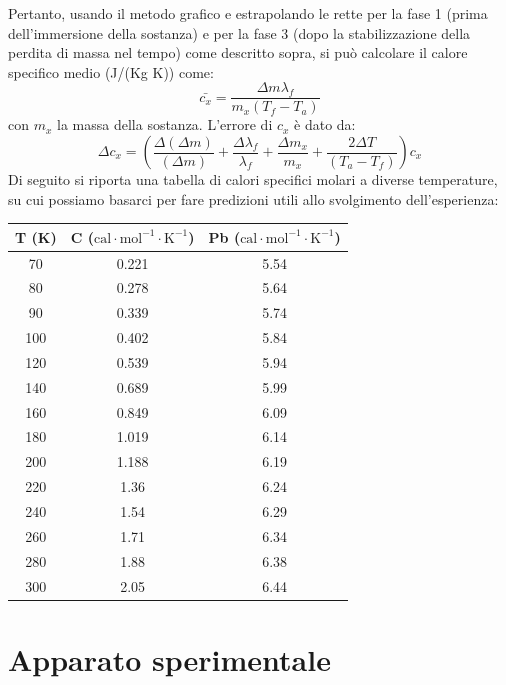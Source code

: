 \documentclass[a4paper,12pt]{article}
\begin{document}
Pertanto, usando il metodo grafico e estrapolando le rette per la fase 1 (prima dell'immersione
della sostanza) e per la fase 3 (dopo la stabilizzazione della perdita di massa nel tempo) come
descritto sopra, si può calcolare il calore specifico medio (J/(Kg K)) come:
\begin{equation*}
        \bar{c_x} = \frac{\Delta m \lambda_f}{m_x (T_f - T_a)}
\end{equation*}
con $m_x$ la massa della sostanza. L'errore di $c_x$ è dato da:
\begin{equation*}
    \Delta c_x = \left( \frac{\Delta (\Delta m)}{(\Delta m)} + \frac{\Delta \lambda_f}{\lambda_f} + \frac{\Delta m_x}{m_x} + \frac{2 \Delta T}{(T_a - T_f)} \right) c_x
\end{equation*}
Di seguito si riporta una tabella di calori specifici molari a diverse temperature, su cui possiamo basarci per 
fare predizioni utili allo svolgimento dell'esperienza:
\begin{table}[H]
\centering
\begin{tabular}{ccc}
\toprule
\textbf{T} (K) & \textbf{C} ($\text{cal}\cdot\text{mol}^{-1}\cdot\text{K}^{-1}$) & \textbf{Pb} ($\text{cal}\cdot\text{mol}^{-1}\cdot\text{K}^{-1}$) \\
\midrule
70  & 0.221 & 5.54 \\
80  & 0.278 & 5.64 \\
90  & 0.339 & 5.74 \\
100 & 0.402 & 5.84 \\
120 & 0.539 & 5.94 \\
140 & 0.689 & 5.99 \\
160 & 0.849 & 6.09 \\
180 & 1.019 & 6.14 \\
200 & 1.188 & 6.19 \\
220 & 1.36  & 6.24 \\
240 & 1.54  & 6.29 \\
260 & 1.71  & 6.34 \\
280 & 1.88  & 6.38 \\
300 & 2.05  & 6.44 \\
\bottomrule
\end{tabular}
\end{table}



\iffalse
\section{Apparato sperimentale}
\end{document}
